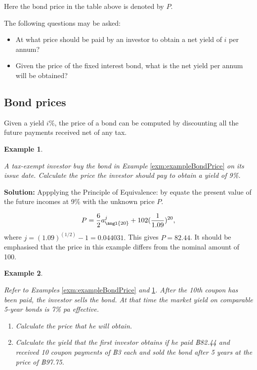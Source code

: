 \documentclass[
]{book}
\theoremstyle{definition}
\theoremstyle{definition}
\newtheorem{example}{Example}[chapter]
\theoremstyle{definition}
\theoremstyle{definition}
\theoremstyle{remark}
\begin{document}
Here the bond price in the table above is denoted by \(P\).

The following questions may be asked:

\begin{itemize}
\item
  At what price should be paid by an investor to obtain a net yield of
  \(i\) per annum?
\item
  Given the price of the fixed interest bond, what is the net yield
  per annum will be obtained?
\end{itemize}

\hypertarget{bond-prices}{%
\subsection{Bond prices}\label{bond-prices}}

Given a yield \(i\%\), the price of a bond can be computed by discounting
all the future payments received net of any tax.

\begin{example}
\protect\hypertarget{exm:exampleBondPrice2}{}\label{exm:exampleBondPrice2}

\emph{A tax-exempt investor buy the bond in Example}
\ref{exm:exampleBondPrice} \emph{on its issue date. Calculate the price the
investor should pay to obtain a yield of 9\%.}

\end{example}

\textbf{Solution:} Appplying the Principle of Equivalence: by equate the
present value of the future incomes at 9\% with the unknown price \(P\).

\[P = \frac{6}{2} a^j_{\angl{20}} + 102 (\frac{1}{1.09})^{20},\] where
\(j = (1.09)^{(1/2)} - 1 = 0.044031.\) This gives \(P = 82.44\). It should
be emphasised that the price in this example differs from the nominal
amount of 100.

\begin{example}
\protect\hypertarget{exm:unlabeled-div-55}{}\label{exm:unlabeled-div-55}

\emph{Refer to Examples} \ref{exm:exampleBondPrice} \emph{and}
\ref{exm:exampleBondPrice2}\emph{. After the 10th coupon has been paid, the
investor sells the bond. At that time the market yield on comparable
5-year bonds is 7\% pa effective.}

\begin{enumerate}
\def\labelenumi{\arabic{enumi}.}
\item
  \emph{Calculate the price that he will obtain.}
\item
  \emph{Calculate the yield that the first investor obtains if he paid
  ฿82.44 and received 10 coupon payments of ฿3 each and sold the bond
  after 5 years at the price of ฿97.75.}
\end{enumerate}

\end{example}
\end{document}
